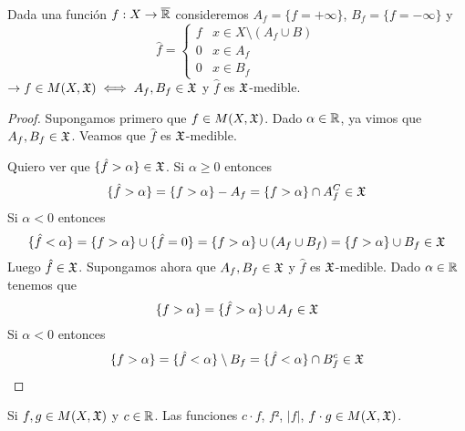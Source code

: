 \begin{lemma}
    Dada una función $f: X \to \overline{\mathbb{R}}$ consideremos $A_f = \{ f = +\infty \}$, $B_f = \{ f = -\infty \}$ y
    \begin{equation*} \hat{f} = \begin{cases}
            f & x \in X \setminus (A_f \cup B) \\
            0 & x \in A_f                      \\
            0 & x \in B_f
        \end{cases}
    \end{equation*}
    $\to f \in M(X, \mathfrak{X}) \iff A_f, B_f \in \mathfrak{X}$ y $\hat{f}$ es $\mathfrak{X}$-medible.
    \begin{proof}
        Supongamos primero que $f \in M(X, \mathfrak{X})$. Dado $\alpha \in \mathbb{R}$, ya vimos que $A_f, B_f \in \mathfrak{X}$. Veamos que $\hat{f}$ es $\mathfrak{X}$-medible.

        Quiero ver que $\{ \hat{f} > \alpha \} \in \mathfrak{X}$. Si $\alpha \geq 0$ entonces
        \begin{equation*}
            \{ \hat{f} > \alpha \} = \{ f > \alpha \} - A_f = \{ f > \alpha \} \cap A_f^C \in \mathfrak{X}
        \end{equation*}
        Si $\alpha < 0$ entonces \begin{equation*}
            \{ \hat{f} < \alpha \} = \{ f > \alpha \} \cup \{ \hat{f} = 0 \} = \{ f > \alpha \} \cup (A_f \cup B_f) = \{ f > \alpha\} \cup B_f \in \mathfrak{X}
        \end{equation*}
        Luego $\hat{f} \in \mathfrak{X}$. Supongamos ahora que $A_f, B_f \in \mathfrak{X}$ y $\hat{f}$ es $\mathfrak{X}$-medible. Dado $\alpha \in \mathbb{R}$ tenemos que \begin{equation*}
            \{ f > \alpha \} = \{ \hat{f} > \alpha \} \cup A_f \in \mathfrak{X}
        \end{equation*}
        Si $\alpha < 0$ entonces \begin{equation*}
            \{ f > \alpha \} = \{ \hat{f} < \alpha \} \setminus B_f = \{ \hat{f} < \alpha \} \cap B_f^c \in \mathfrak{X}
        \end{equation*}
    \end{proof}
\end{lemma}

\begin{corollary}
    Si $f, g \in M(X, \mathfrak{X})$ y $c \in \mathbb{R}$. Las funciones $c \cdot f$, $f²$, $|f|$, $f \cdot g \in M(X, \mathfrak{X})$.
\end{corollary}

